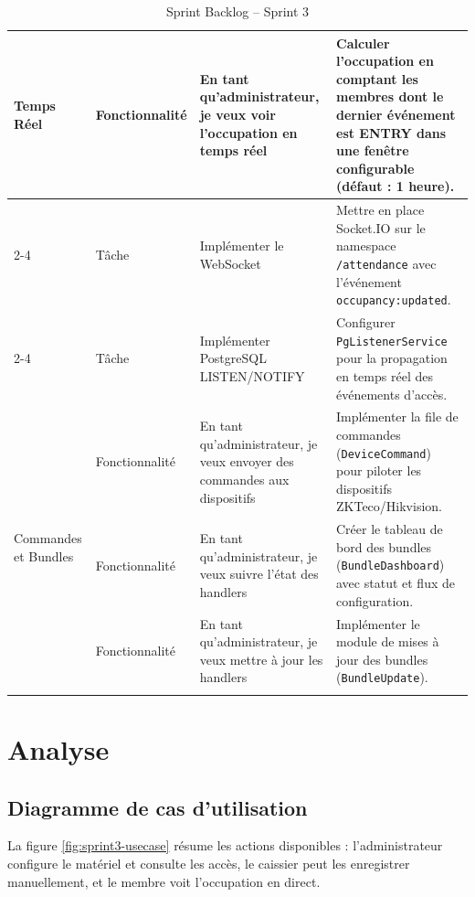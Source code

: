 ﻿\documentclass[../main.tex]{subfiles}
\begin{document}
\begin{longtable}{|p{3cm}|p{2.5cm}|p{4cm}|p{5cm}|}
\multirow{3}{3cm}{Temps R\'{e}el} & Fonctionnalit\'{e} & En tant qu'administrateur, je veux voir l'occupation en temps r\'{e}el & Calculer l'occupation en comptant les membres dont le dernier \'{e}v\'{e}nement est ENTRY dans une fen\^{e}tre configurable (d\'{e}faut : 1 heure). \\
\cline{2-4}
& T\^{a}che & Impl\'{e}menter le WebSocket & Mettre en place Socket.IO sur le namespace \texttt{/attendance} avec l'\'{e}v\'{e}nement \texttt{occupancy:updated}. \\
\cline{2-4}
& T\^{a}che & Impl\'{e}menter PostgreSQL LISTEN/NOTIFY & Configurer \texttt{PgListenerService} pour la propagation en temps r\'{e}el des \'{e}v\'{e}nements d'acc\`{e}s. \\
\hline

\multirow{3}{3cm}{Commandes et Bundles} & Fonctionnalit\'{e} & En tant qu'administrateur, je veux envoyer des commandes aux dispositifs & Impl\'{e}menter la file de commandes (\texttt{DeviceCommand}) pour piloter les dispositifs ZKTeco/Hikvision. \\
\cline{2-4}
& Fonctionnalit\'{e} & En tant qu'administrateur, je veux suivre l'\'{e}tat des handlers & Cr\'{e}er le tableau de bord des bundles (\texttt{BundleDashboard}) avec statut et flux de configuration. \\
\cline{2-4}
& Fonctionnalit\'{e} & En tant qu'administrateur, je veux mettre \`{a} jour les handlers & Impl\'{e}menter le module de mises \`{a} jour des bundles (\texttt{BundleUpdate}). \\
\hline

\caption{Sprint Backlog -- Sprint 3}
\label{tab:sprint3-backlog}
\end{longtable}

\section{Analyse}

\subsection{Diagramme de cas d'utilisation}

La figure \ref{fig:sprint3-usecase} r\'{e}sume les actions disponibles : l'administrateur configure le mat\'{e}riel et consulte les acc\`{e}s, le caissier peut les enregistrer manuellement, et le membre voit l'occupation en direct.
\end{document}
